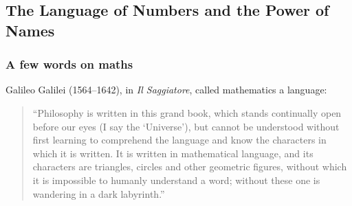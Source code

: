 \subsection{The Language of Numbers and the Power of Names}
\label{sec:numbers-and-names}

\subsubsection{A few words on maths}

Galileo Galilei (1564--1642), in \emph{Il Saggiatore}, called mathematics a language:

\begin{quote}\small
``Philosophy is written in this grand book, which stands continually open before our
eyes (I say the `Universe'), but cannot be understood without first learning to
comprehend the language and know the characters in which it is written. It is written in
mathematical language, and its characters are triangles, circles and other geometric
figures, without which it is impossible to humanly understand a word; without these one
is wandering in a dark labyrinth.''
\end{quote}

